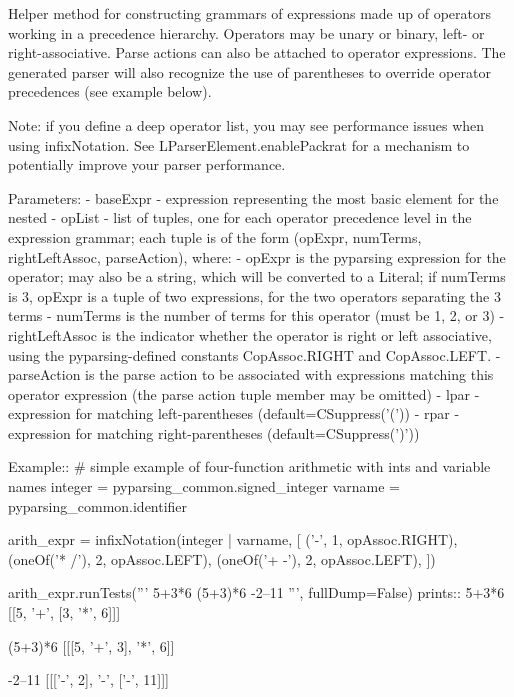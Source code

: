 \begin{DoxyVerb}Helper method for constructing grammars of expressions made up of
operators working in a precedence hierarchy.  Operators may be unary or
binary, left- or right-associative.  Parse actions can also be attached
to operator expressions. The generated parser will also recognize the use 
of parentheses to override operator precedences (see example below).

Note: if you define a deep operator list, you may see performance issues
when using infixNotation. See L{ParserElement.enablePackrat} for a
mechanism to potentially improve your parser performance.

Parameters:
 - baseExpr - expression representing the most basic element for the nested
 - opList - list of tuples, one for each operator precedence level in the
  expression grammar; each tuple is of the form
  (opExpr, numTerms, rightLeftAssoc, parseAction), where:
   - opExpr is the pyparsing expression for the operator;
      may also be a string, which will be converted to a Literal;
      if numTerms is 3, opExpr is a tuple of two expressions, for the
      two operators separating the 3 terms
   - numTerms is the number of terms for this operator (must
      be 1, 2, or 3)
   - rightLeftAssoc is the indicator whether the operator is
      right or left associative, using the pyparsing-defined
      constants C{opAssoc.RIGHT} and C{opAssoc.LEFT}.
   - parseAction is the parse action to be associated with
      expressions matching this operator expression (the
      parse action tuple member may be omitted)
 - lpar - expression for matching left-parentheses (default=C{Suppress('(')})
 - rpar - expression for matching right-parentheses (default=C{Suppress(')')})

Example::
    # simple example of four-function arithmetic with ints and variable names
    integer = pyparsing_common.signed_integer
    varname = pyparsing_common.identifier 
    
    arith_expr = infixNotation(integer | varname,
        [
        ('-', 1, opAssoc.RIGHT),
        (oneOf('* /'), 2, opAssoc.LEFT),
        (oneOf('+ -'), 2, opAssoc.LEFT),
        ])
    
    arith_expr.runTests('''
        5+3*6
        (5+3)*6
        -2--11
        ''', fullDump=False)
prints::
    5+3*6
    [[5, '+', [3, '*', 6]]]

    (5+3)*6
    [[[5, '+', 3], '*', 6]]

    -2--11
    [[['-', 2], '-', ['-', 11]]]
\end{DoxyVerb}
 \mbox{\label{namespacepkg__resources_1_1__vendor_1_1pyparsing_a2b9d7cf674162311ae0dfa5938ef17d6}} 
